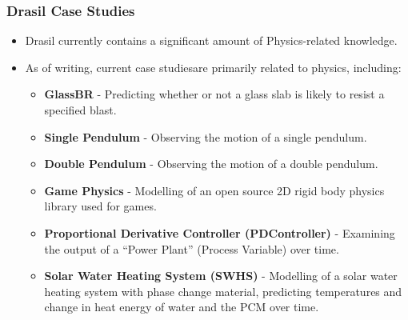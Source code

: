 \documentclass{beamer}
\begin{document}
\begin{frame}
    \frametitle{Drasil Case Studies}
    \begin{itemize}
        \item<2-> Drasil currently contains a significant amount of Physics-related knowledge.
        \item<3-> As of writing, current case studies\footnotemark[1] are primarily related to physics, including:
            \begin{itemize}
                \item<4-> \textbf{GlassBR} - Predicting whether or not a glass slab is likely to resist a specified blast.
                \item<5-> \textbf{Single Pendulum} - Observing the motion of a single pendulum.
                \item<6-> \textbf{Double Pendulum} - Observing the motion of a double pendulum.
                \item<7-> \textbf{Game Physics} - Modelling of an open source 2D rigid body physics library used for games.
                \item<8-> \textbf{Proportional Derivative Controller (PDController)} - Examining the output of a ``Power Plant'' (Process Variable) over time.
                \item<9-> \textbf{Solar Water Heating System (SWHS)} - Modelling of a solar water heating system with phase change material, predicting temperatures and change in heat energy of water and the PCM over time.
            \end{itemize}
    \end{itemize}

\end{frame}
\end{document}

